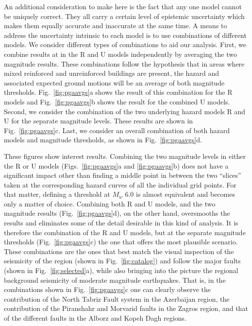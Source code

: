 An additional consideration to make here is the fact that any one model cannot be uniquely correct. They all carry a certain level of epistemic uncertainty which makes them equally accurate and inaccurate at the same time. A means to address the uncertainty intrinsic to each model is to use combinations of different models. We consider different types of combinations to aid our analysis. First, we combine results at in the R and U models independently by averaging the two magnitude results. These combinations follow the hypothesis that in areas where mixed reinforced and unreinforced buildings are present, the hazard and associated expected ground motions will be an average of both magnitude thresholds. Fig.~\ref{fig:pgaavgs}a shows the result of this combination for the R models and Fig.~\ref{fig:pgaavgs}b shows the result for the combined U models. Second, we consider the combination of the two underlying hazard models R and U for the separate magnitude levels. These results are shown in Fig.~\ref{fig:pgaavgs}c. Last, we consider an overall combination of both hazard models and magnitude thresholds, as shown in Fig.~\ref{fig:pgaavgs}d.

These figures show interest results. Combining the two magnitude levels in either the R or U models (Figs.~\ref{fig:pgaavgs}a and \ref{fig:pgaavgs}b) does not have a significant impact other than finding a middle point in between the two ``slices'' taken at the corresponding hazard curves of all the individual grid points. For that matter, defining a threshold at $M_w$ 6.0 is almost equivalent and becomes only a matter of choice. Combining both R and U models, and the two magnitude results (Fig.~\ref{fig:pgaavgs}d), on the other hand, oversmooths the results and eliminates some of the detail desirable in this kind of analysis. It is therefore the combination of the R and U models, but at the separate magnitude thresholds (Fig.~\ref{fig:pgaavgs}c) the one that offers the most plausible scenario. These combinations are the ones that best match the visual inspection of the seismicity of the region (shown in Fig.~\ref{fig:catalog}) and follow the major faults (shown in Fig.~\ref{fig:selected}a), while also bringing into the picture the regional background seismicity of moderate magnitude earthquakes. That is, in the combinations shown in Fig.~\ref{fig:pgaavgs}c one can clearly observe the contribution of the North Tabriz Fault system in the Azerbaijan region, the contribution of the Piranshahr and Morvarid faults in the Zagros region, and that of the different faults in the Alborz and Kopeh Dagh regions. 

